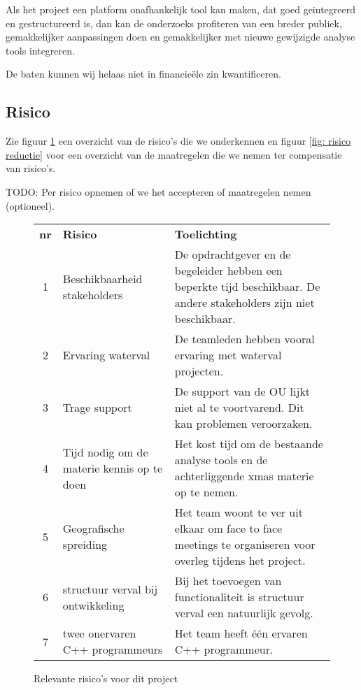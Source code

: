 Als het project een platform onafhankelijk tool kan maken, dat goed geintegreerd en gestructureerd
is, dan kan de onderzoeks profiteren van een breder publiek, gemakkelijker aanpassingen doen en gemakkelijker
met nieuwe gewijzigde analyse tools integreren.

De baten kunnen wij helaas niet in financie\"ele zin kwantificeren.

\subsection{Risico}

Zie figuur \ref{fig: risico} een overzicht van de risico's die we onderkennen en figuur \ref{fig: risico reductie} voor
een overzicht van de maatregelen die we nemen ter compensatie van risico's.

TODO: Per risico opnemen of we het accepteren of maatregelen nemen (optioneel).


\begin{figure}[ht]
\begin{center}
\small
\begin{tabular}{cp{10em}p{20em}}
{\bf nr} & {\bf Risico} & {\bf Toelichting} \\
 1 & Beschikbaarheid stakeholders  & De opdrachtgever en de begeleider hebben een beperkte tijd
					beschikbaar. De andere stakeholders zijn niet beschikbaar.\\
 2 & Ervaring waterval & De teamleden hebben vooral ervaring met waterval projecten.\\
 3 & Trage support & De support van de OU lijkt niet al te voortvarend. Dit kan problemen veroorzaken.\\
 4 & Tijd nodig om de materie kennis op te doen & Het kost tijd om de bestaande analyse
					tools en de achterliggende
					xmas materie op te nemen.\\
 5 & Geografische spreiding & Het team woont te ver uit elkaar om face to face meetings te
				organiseren voor overleg tijdens het project.\\
 6 & structuur verval bij ontwikkeling & Bij het toevoegen van functionaliteit is structuur verval een
				natuurlijk gevolg.\\
 7 & twee onervaren C++ programmeurs & Het team heeft \'e\'en ervaren C++ programmeur.\\

\end{tabular}
\end{center}
 \caption{Relevante risico's voor dit project}
 \label{fig: risico}
\end{figure}


